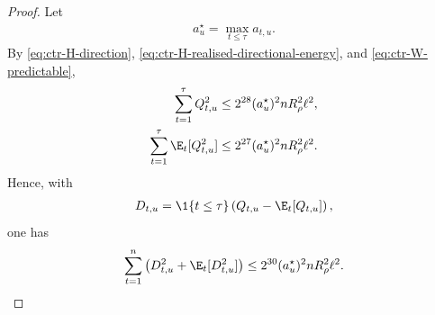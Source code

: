 \begin{proof}
    Let
    \begin{align}
        a_u^\star=\max_{t\leq\tau}a_{t,u}.
    \end{align}
    By \eqref{eq:ctr-H-direction},
    \eqref{eq:ctr-H-realised-directional-energy}, and
    \eqref{eq:ctr-W-predictable},
    \begin{align}
        \sum_{t=1}^{\tau}Q_{t,u}^2
         & \leq2^{28}(a_u^\star)^2nR_\rho^2\ell^2,
        \\
        \sum_{t=1}^{\tau}\E_t[Q_{t,u}^2]
         & \leq2^{27}(a_u^\star)^2nR_\rho^2\ell^2.
    \end{align}
    Hence, with
    \begin{align}
        D_{t,u}=\1\{t\leq\tau\}
        \left(Q_{t,u}-\E_t[Q_{t,u}]\right),
    \end{align}
    one has
    \begin{align}
        \sum_{t=1}^n
        \left(D_{t,u}^2+\E_t[D_{t,u}^2]\right)
        \leq2^{30}(a_u^\star)^2nR_\rho^2\ell^2.
        \label{eq:ctr-H-self-normaliser}
    \end{align}


\end{proof}
